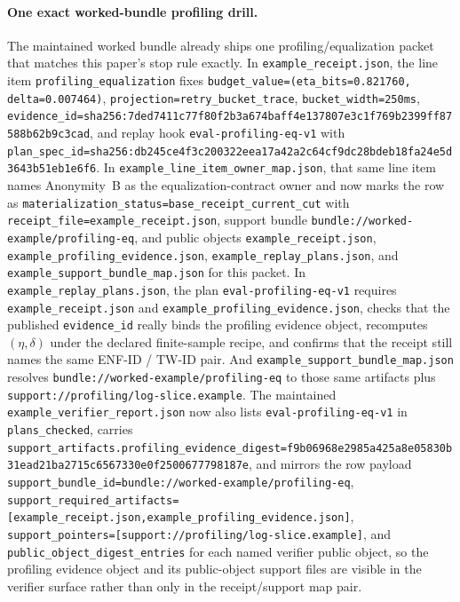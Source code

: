 \documentclass[11pt]{article}
\begin{document}
\paragraph{One exact worked-bundle profiling drill.}
The maintained worked bundle already ships one profiling/equalization packet that matches this paper's stop rule exactly.
In \nolinkurl{example\_receipt.json}, the line item \nolinkurl{profiling\_equalization} fixes \nolinkurl{budget\_value=(eta\_bits=0.821760, delta=0.007464)}, \nolinkurl{projection=retry\_bucket\_trace}, \nolinkurl{bucket\_width=250ms}, \nolinkurl{evidence\_id=sha256:7ded7411c77f80f2b3a674baff4e137807e3c1f769b2399ff87588b62b9c3cad}, and replay hook \nolinkurl{eval-profiling-eq-v1} with \nolinkurl{plan\_spec\_id=sha256:db245ce4f3c200322eea17a42a2c64cf9dc28bdeb18fa24e5d3643b51eb1e6f6}.
In \nolinkurl{example\_line\_item\_owner\_map.json}, that same line item names Anonymity~B as the equalization-contract owner and now marks the row as \nolinkurl{materialization\_status=base\_receipt\_current\_cut} with \nolinkurl{receipt\_file=example\_receipt.json}, support bundle \nolinkurl{bundle://worked-example/profiling-eq}, and public objects \nolinkurl{example\_receipt.json}, \nolinkurl{example\_profiling\_evidence.json}, \nolinkurl{example\_replay\_plans.json}, and \nolinkurl{example\_support\_bundle\_map.json} for this packet.
In \nolinkurl{example\_replay\_plans.json}, the plan \nolinkurl{eval-profiling-eq-v1} requires \nolinkurl{example\_receipt.json} and \nolinkurl{example\_profiling\_evidence.json}, checks that the published \nolinkurl{evidence\_id} really binds the profiling evidence object, recomputes $(\eta,\delta)$ under the declared finite-sample recipe, and confirms that the receipt still names the same ENF-ID / TW-ID pair.
And \nolinkurl{example\_support\_bundle\_map.json} resolves \nolinkurl{bundle://worked-example/profiling-eq} to those same artifacts plus \nolinkurl{support://profiling/log-slice.example}. The maintained \nolinkurl{example\_verifier\_report.json} now also lists \nolinkurl{eval-profiling-eq-v1} in \nolinkurl{plans_checked}, carries \nolinkurl{support_artifacts.profiling_evidence_digest=f9b06968e2985a425a8e05830b31ead21ba2715c6567330e0f2500677798187e}, and mirrors the row payload \nolinkurl{support_bundle_id=bundle://worked-example/profiling-eq}, \nolinkurl{support_required_artifacts=[example_receipt.json,example_profiling_evidence.json]}, \nolinkurl{support_pointers=[support://profiling/log-slice.example]}, and \nolinkurl{public_object_digest_entries} for each named verifier public object, so the profiling evidence object and its public-object support files are visible in the verifier surface rather than only in the receipt/support map pair.
\end{document}
